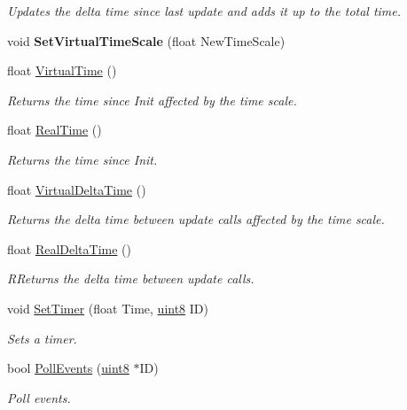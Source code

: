 \begin{DoxyCompactItemize}
\begin{DoxyCompactList}\small\item\em Updates the delta time since last update and adds it up to the total time. \end{DoxyCompactList}\item 
void {\bfseries Set\+Virtual\+Time\+Scale} (float New\+Time\+Scale)\hypertarget{classae_core_1_1ae_clock_a1686e1930401b233c111c053ffbb86b9}{}\label{classae_core_1_1ae_clock_a1686e1930401b233c111c053ffbb86b9}

\item 
float \hyperlink{classae_core_1_1ae_clock_af5107b6562e3e41188c7ccc612e4ce02}{Virtual\+Time} ()
\begin{DoxyCompactList}\small\item\em Returns the time since Init affected by the time scale. \end{DoxyCompactList}\item 
float \hyperlink{classae_core_1_1ae_clock_a74aea87d4d9e4677b71e01f15b8ec4c4}{Real\+Time} ()
\begin{DoxyCompactList}\small\item\em Returns the time since Init. \end{DoxyCompactList}\item 
float \hyperlink{classae_core_1_1ae_clock_abdece9ee5808544bfc1702971ec93f06}{Virtual\+Delta\+Time} ()
\begin{DoxyCompactList}\small\item\em Returns the delta time between update calls affected by the time scale. \end{DoxyCompactList}\item 
float \hyperlink{classae_core_1_1ae_clock_a33b092b1400916479afb3bd2d815e227}{Real\+Delta\+Time} ()
\begin{DoxyCompactList}\small\item\em R\+Returns the delta time between update calls. \end{DoxyCompactList}\item 
void \hyperlink{classae_core_1_1ae_clock_a67f071560800444211da74c195fbcf77}{Set\+Timer} (float Time, \hyperlink{namespaceae_core_aa13093dc911869e5b24942552898f01f}{uint8} ID)
\begin{DoxyCompactList}\small\item\em Sets a timer. \end{DoxyCompactList}\item 
bool \hyperlink{classae_core_1_1ae_clock_a01f37c5f4c2ec3902f9fffedb1841a09}{Poll\+Events} (\hyperlink{namespaceae_core_aa13093dc911869e5b24942552898f01f}{uint8} $\ast$ID)
\begin{DoxyCompactList}\small\item\em Poll events. \end{DoxyCompactList}\end{DoxyCompactItemize}


